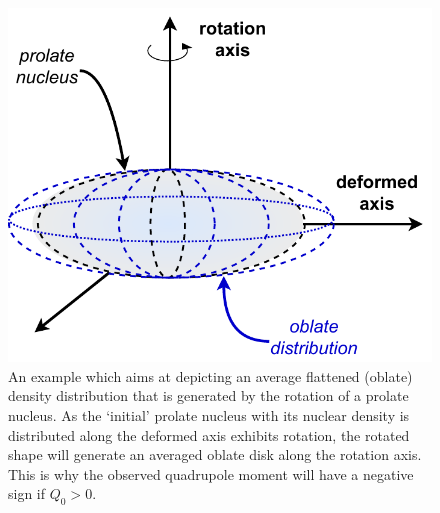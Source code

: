 \begin{figure}
    \centering
    \includegraphics[scale=0.65]{Chapters/Figures/averaged_nuclearMatter_prolate.pdf}
    \caption{An example which aims at depicting an average flattened (oblate) density distribution that is generated by the rotation of a prolate nucleus. As the `initial' prolate nucleus with its nuclear density is distributed along the deformed axis exhibits rotation, the rotated shape will generate an averaged oblate disk along the rotation axis. This is why the observed quadrupole moment will have a negative sign if $Q_0>0$.}
    \label{fig-averaged-prolate-density}
\end{figure}


